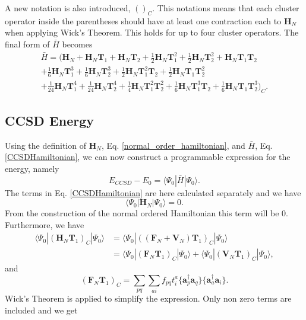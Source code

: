 \documentclass[a4paper,norsk,11pt,twoside]{report}
\begin{document}
A new notation is also introduced, $()_C$. This notations means that
each cluster operator inside the parentheses should have at least one
contraction each to $\textbf{H}_N$ when applying Wick's Theorem. This
holds for up to four cluster operators.
The final form of $\bar{H}$ becomes
\begin{equation}
\begin{split}
\bar{H} = 
\big( \textbf{H}_N + \textbf{H}_N \textbf{T}_1 + \textbf{H}_N \textbf{T}_2
+ \frac{1}{2} \textbf{H}_N \textbf{T}_1^2
+ \frac{1}{2} \textbf{H}_N \textbf{T}_2^2
+ \textbf{H}_N \textbf{T}_1 \textbf{T}_2 \\
+ \frac{1}{6} \textbf{H}_N \textbf{T}_1^3
+ \frac{1}{6} \textbf{H}_N \textbf{T}_2^3
+ \frac{1}{2} \textbf{H}_N \textbf{T}_1^2 \textbf{T}_2
+ \frac{1}{2} \textbf{H}_N \textbf{T}_1 \textbf{T}_2^2 \\ 
+ \frac{1}{24} \textbf{H}_N \textbf{T}_1^4
+ \frac{1}{24} \textbf{H}_N \textbf{T}_2^4
+ \frac{1}{4} \textbf{H}_N \textbf{T}_1^2 \textbf{T}_2^2
+ \frac{1}{6} \textbf{H}_N \textbf{T}_1^3 \textbf{T}_2
+ \frac{1}{6} \textbf{H}_N \textbf{T}_1 \textbf{T}_2^3 \big)_C  .
\end{split} \label{CCSDHamiltonian}
\end{equation}

\subsection{CCSD Energy}
Using the definition of $\textbf{H}_N$, Eq. \eqref{normal_order_hamiltonian}, and $\bar{H}$, Eq. \eqref{CCSDHamiltonian}, we can now construct a programmable expression for the energy, namely
\begin{equation}
E_{CCSD} - E_0 = \langle \Psi_0 | \bar{H} | \Psi_0 \rangle .
\end{equation}
The terms in Eq. \eqref{CCSDHamiltonian} are here calculated separately and we have
\begin{equation}
\langle \Psi_0 | \textbf{H}_N | \Psi_0 \rangle = 0 .
\end{equation}
From the construction of the normal ordered Hamiltonian this term will be 0.
Furthermore, we have
\begin{align}
\langle \Psi_0 | (\textbf{H}_N \textbf{T}_1)_C | \Psi_0 \rangle & = \langle \Psi_0 | \left((\textbf{F}_N + \textbf{V}_N ) \textbf{T}_1 \right)_C | \Psi_0 \rangle \nonumber \\ &
= \langle \Psi_0 | (\textbf{F}_N \textbf{T}_1)_C | \Psi_0 \rangle + \langle \Psi_0 | (\textbf{V}_N \textbf{T}_1)_C | \Psi_0 \rangle, \label{ene_1}
\end{align}
and
\begin{equation}
(\textbf{F}_N \textbf{T}_1)_C  = \sum_{pq} \sum_{ai} f_{pq} t_i^a  \{ \textbf{a}^{\dag}_p \textbf{a}_q\}  \{\textbf{a}^{\dag}_a \textbf{a}_i \} . 
\end{equation}
Wick's Theorem is applied to simplify the expression. Only non zero terms are included and we get
\end{document}
